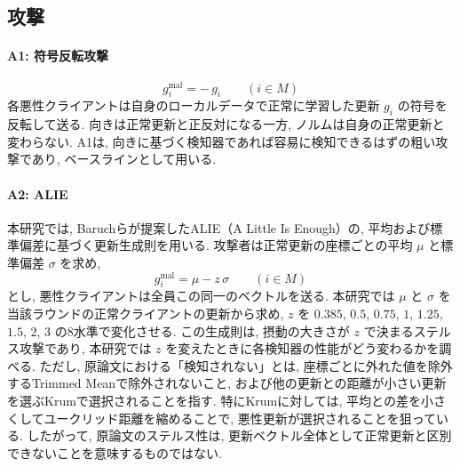 \documentclass[a4j, twocolumn, dvipdfmx]{jsarticle}
\begin{document}
\subsection{攻撃}
\label{sec:attacks}

\paragraph{A1: 符号反転攻撃}
\begin{equation}
g_i^{\text{mal}} = -\,g_i \qquad (i \in M)
\end{equation}
各悪性クライアントは自身のローカルデータで正常に学習した更新 $g_i$ の符号を反転して送る. 向きは正常更新と正反対になる一方, ノルムは自身の正常更新と変わらない. A1は, 向きに基づく検知器であれば容易に検知できるはずの粗い攻撃であり, ベースラインとして用いる.

\paragraph{A2: ALIE}
本研究では, Baruchら\cite{baruch2019little}が提案したALIE（A Little Is Enough）の, 平均および標準偏差に基づく更新生成則を用いる. 攻撃者は正常更新の座標ごとの平均 $\mu$ と標準偏差 $\sigma$ を求め,
\begin{equation}
g_i^{\text{mal}} = \mu - z\,\sigma \qquad (i \in M)
\label{eq:alie}
\end{equation}
とし, 悪性クライアントは全員この同一のベクトルを送る. 本研究では $\mu$ と $\sigma$ を当該ラウンドの正常クライアントの更新から求め, $z$ を $0.385$, $0.5$, $0.75$, $1$, $1.25$, $1.5$, $2$, $3$ の8水準で変化させる. この生成則は, 摂動の大きさが $z$ で決まるステルス攻撃であり, 本研究では $z$ を変えたときに各検知器の性能がどう変わるかを調べる. ただし, 原論文における「検知されない」とは, 座標ごとに外れた値を除外するTrimmed Meanで除外されないこと, および他の更新との距離が小さい更新を選ぶKrumで選択されることを指す. 特にKrumに対しては, 平均との差を小さくしてユークリッド距離を縮めることで, 悪性更新が選択されることを狙っている. したがって, 原論文のステルス性は, 更新ベクトル全体として正常更新と区別できないことを意味するものではない.
\end{document}
